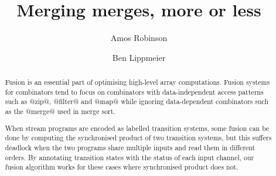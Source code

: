 \documentclass[acmlarge,review,anonymous]{acmart}\settopmatter{printfolios=true}
\begin{document}
\title{Merging merges, more or less}

\author{Amos Robinson}

\author{Ben Lippmeier}

\makeatactive
\begin{abstract}
Fusion is an essential part of optimising high-level array computations.
Fusion systems for combinators tend to focus on combinators with data-independent access patterns such as @zip@, @filter@ and @map@ while ignoring data-dependent combinators such as the @merge@ used in merge sort.

When stream programs are encoded as labelled transition systems, some fusion can be done by computing the synchronised product of two transition systems, but this suffers deadlock when the two programs share multiple inputs and read them in different orders.
By annotating transition states with the status of each input channel, our fusion algorithm works for these cases where synchronised product does not.
\end{abstract}


\maketitle






\end{document}
